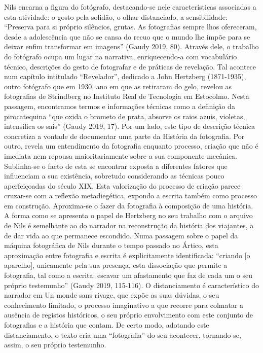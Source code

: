 \documentclass{article}
\begin{document}
Nils encarna a figura do fotógrafo, destacando-se nele características associadas a
esta atividade: o gosto pela solidão, o olhar distanciado, a sensibilidade: “Preserva
para si próprio silêncios, grutas. As fotografias sempre lhos ofereceram, desde a adolescência que não se cansa do recuo que o mundo lhe impõe para se deixar enfim
transformar em imagens” (Gaudy 2019, 80). Através dele, o trabalho do fotógrafo
ocupa um lugar na narrativa, enriquecendo-a com vocabulário técnico, descrições do
gesto de fotografar e de práticas de revelação. Tal acontece num capítulo intitulado
“Revelador”, dedicado a John Hertzberg (1871-1935), outro fotógrafo que em 1930,
ano em que as retiraram do gelo, revelou as fotografias de Strindberg no Instituto
Real de Tecnologia em Estocolmo. Nesta passagem, encontramos termos e informações técnicas como a definição da pirocatequina “que oxida o brometo de prata, absorve os raios azuis, violetas, intensifica os sais” (Gaudy 2019, 17). Por um lado, este
tipo de descrição técnica concretiza a vontade de documentar uma parte da História
da fotografia. Por outro, revela um entendimento da fotografia enquanto processo,
criação que não é imediata nem repousa maioritariamente sobre a sua componente
mecânica. Sublinha-se o facto de esta se encontrar exposta a diferentes fatores que
influenciam a sua existência, sobretudo considerando as técnicas pouco aperfeiçoadas do século XIX. Esta valorização do processo de criação parece cruzar-se com a
reflexão metadiegética, expondo a escrita também como processo em construção.
Aproxima-se o fazer da fotografia à composição de uma história. A forma como se
apresenta o papel de Hertzberg no seu trabalho com o arquivo de Nils é semelhante
ao do narrador na reconstrução da história dos viajantes, a de dar vida ao que permanece escondido. Numa passagem sobre o papel da máquina fotográfica de Nils
durante o tempo passado no Ártico, esta aproximação entre fotografia e escrita é
explicitamente identificada: “criando [o aparelho], unicamente pela sua presença,
esta dissociação que permite a fotografia, tal como a escrita: escavar um afastamento
que faz de cada um o seu próprio testemunho” (Gaudy 2019, 115-116). O distanciamento é característico do narrador em Un monde sans rivage, que expõe as suas dúvidas, o seu conhecimento limitado, o processo imaginativo a que recorre para colmatar a ausência de registos históricos, o seu próprio envolvimento com este conjunto
de fotografias e a história que contam. De certo modo, adotando este distanciamento,
o texto cria uma “fotografia” do seu acontecer, tornando-se, assim, o seu próprio testemunho.
\end{document}
